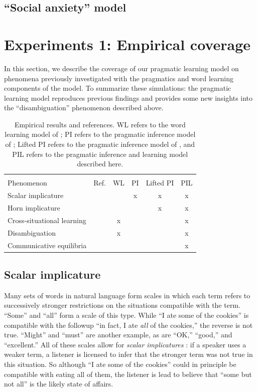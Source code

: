 \documentclass{article} %
\begin{document}
\subsection{``Social anxiety'' model}

\section{Experiments 1: Empirical coverage}

In this section, we describe the coverage of our pragmatic learning model on phenomena previously investigated with the pragmatics and word learning components of the model. To summarize these simulations: the pragmatic learning model reproduces previous findings and provides some new insights into the ``disambiguation'' phenomenon described above. 

\begin{table}[t]
\label{tab:results}
\begin{center}
\begin{tabular}{lccccc}
\hline \\
Phenomenon & Ref. & WL & PI & Lifted PI  & PIL \\
\hline
Scalar implicature & \cite{grice1975} &  & x &x & x\\
Horn implicature & \cite{horn1984} & &  & x& x\\
Cross-situational learning & \cite{smith2008} & x& & & x \\
Disambiguation & \cite{markman1988} &x  & & & x \\
Communicative equilibria & \cite{galantucci2005} & & & & x \\
\hline
\end{tabular}
\end{center}
\caption{Empirical results and references. WL refers to the word learning model of \cite{frank2009}; PI refers to the pragmatic inference model of \cite{frank2012}; Lifted PI refers to the pragmatic inference model of \cite{bergen2012}, and PIL refers to the pragmatic inference and learning model described here.  }

\end{table}


\subsection{Scalar implicature}

Many sets of words in natural language form scales in which each term refers to successively stronger restrictions on the situations compatible with the term. ``Some'' and ``all'' form a scale of this type. While ``I ate some of the cookies'' is compatible with the followup ``in fact, I ate {\it all} of the cookies,'' the reverse is not true. ``Might'' and ``must'' are another example, as are ``OK,'' ``good,'' and ``excellent.'' All of these scales allow for {\it scalar implicatures} \cite{grice1975}: if a speaker uses a weaker term, a listener is licensed to infer that the stronger term was not true in this situation. So although ``I ate some of the cookies'' could in principle be compatible with eating all of them, the listener is lead to believe that ``some but not all'' is the likely state of affairs. 
\end{document}
